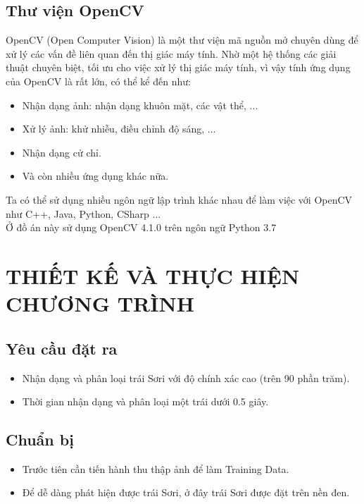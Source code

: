 \documentclass[12pt,a4paper]{article}
\begin{document}
\subsection{Thư viện OpenCV}
OpenCV (Open Computer Vision) là một thư viện mã nguồn mở chuyên dùng để xử lý các vấn đề liên quan đến thị giác máy tính. Nhờ một hệ thống các giải thuật chuyên biệt, tối ưu cho việc xử lý thị giác máy tính, vì vậy tính ứng dụng của OpenCV là rất lớn, có thể kể đến như:
\begin{itemize}
\item Nhận dạng ảnh: nhận dạng khuôn mặt, các vật thể, ...
\item Xử lý ảnh: khử nhiễu, điều chỉnh độ sáng, ...
\item Nhận dạng cử chỉ.
\item Và còn nhiều ứng dụng khác nữa.
\end{itemize}
Ta có thể sử dụng nhiều ngôn ngữ lập trình khác nhau để làm việc với OpenCV như C++, Java, Python, CSharp ... \\Ở đồ án này sử dụng OpenCV 4.1.0 trên ngôn ngữ Python 3.7
\section{THIẾT KẾ VÀ THỰC HIỆN CHƯƠNG TRÌNH}
\subsection{Yêu cầu đặt ra}
\begin{itemize}
\item Nhận dạng và phân loại trái Sơri với độ chính xác cao (trên 90 phần trăm).
\item Thời gian nhận dạng và phân loại một trái dưới 0.5 giây.
\end{itemize}
\subsection{Chuẩn bị}
\begin{itemize}
\item Trước tiên cần tiến hành thu thập ảnh để làm Training Data.
\item Để dễ dàng phát hiện được trái Sơri, ở đây trái Sơri được đặt trên nền đen.
\end{itemize}
\end{document}
